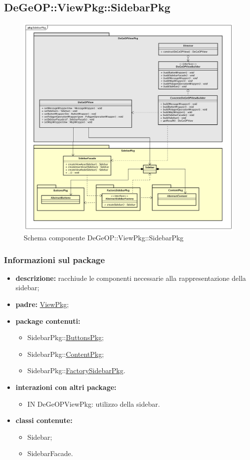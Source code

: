 \subsection{DeGeOP::ViewPkg::SidebarPkg}
\label{pkg::SidebarPkg}
\begin{figure}[H]
	\centering
	\includegraphics[width=\textwidth]{img/PkgDiagram/STSidebarPkg.png}
	\caption{Schema componente DeGeOP::ViewPkg::SidebarPkg}
\end{figure}
\subsubsection{Informazioni sul package}
\begin{itemize}
	\item \textbf{descrizione:} racchiude le componenti necessarie alla rappresentazione della sidebar;
	\item \textbf{padre:} \hyperref[pkg::ViewPkg]{ViewPkg};
	\item \textbf{package contenuti:}
	\begin{itemize}
		\item SidebarPkg::\hyperref[pkg::ButtonsPkg]{ButtonsPkg};
		\item SidebarPkg::\hyperref[pkg::ContentPkg]{ContentPkg};
		\item SidebarPkg::\hyperref[pkg::FactorySidebarPkg]{FactorySidebarPkg}.
	\end{itemize}
	\item \textbf{interazioni con altri package:} 
	\begin{itemize}
		\item IN DeGeOPViewPkg: utilizzo della sidebar.
	\end{itemize}
	\item \textbf{classi contenute:}
	\begin{itemize}
		\item Sidebar;
		\item SidebarFacade.
	\end{itemize}
\end{itemize}
